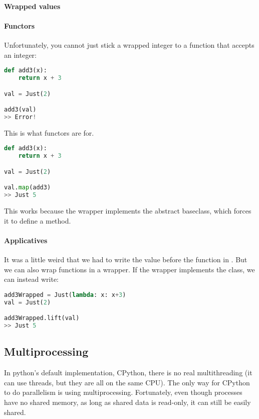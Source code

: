 \paragraph{Wrapped values}

\paragraph{Functors} Unfortunately, you cannot just stick a wrapped integer to a function that accepts an integer: 
\begin{lstlisting}[language=python]
def add3(x):
    return x + 3

val = Just(2)

add3(val) 
>> Error!
\end{lstlisting}

This is what functors are for. 
\begin{lstlisting}[language=python]
def add3(x):
    return x + 3

val = Just(2)

val.map(add3)
>> Just 5
\end{lstlisting}

This works because the  wrapper implements the abstract  baseclass, which forces it to define a  method. 


\paragraph{Applicatives} It was a little weird that we had to write the value before the function in . But we can also wrap functions in a wrapper. If the wrapper implements the  class, we can instead write:

\begin{lstlisting}[language=python]
add3Wrapped = Just(lambda: x: x+3)
val = Just(2)

add3Wrapped.lift(val)
>> Just 5
\end{lstlisting}


\subsection{Multiprocessing}
In python's default implementation, CPython, there is no real multithreading (it can use threads, but they are all on the same CPU).
The only way for CPython to do parallelism is using multiprocessing.
Fortunately, even though processes have no shared memory, as long as shared data is read-only, it can still be easily shared.

